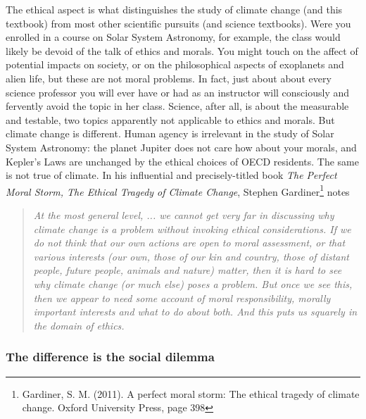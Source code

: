 The ethical aspect is what distinguishes the study of climate change (and this textbook) from most other scientific pursuits (and science textbooks). Were you enrolled in a course on Solar System Astronomy, for example, the class would likely be devoid of the talk of ethics and morals. You might touch on the affect of potential impacts on society, or on the philosophical aspects of exoplanets and alien life, but these are not moral problems. In fact, just about about every science professor you will ever have or had as an instructor will consciously and fervently avoid the topic in her class. Science, after all, is about the measurable and testable, two topics apparently not applicable to ethics and morals. But climate change is different. Human agency is irrelevant in the study of Solar System Astronomy: the planet Jupiter does not care how about your morals, and Kepler's Laws are unchanged by the ethical choices of OECD residents. The same is not true of climate. In his influential and precisely-titled book \textit{The Perfect Moral Storm, The Ethical Tragedy of Climate Change}, Stephen Gardiner\footnote{Gardiner, S. M. (2011). A perfect moral storm: The ethical tragedy of climate change. Oxford University Press, page 398} notes

\begin{quotation}\noindent\textit{At the most general level, ... we cannot get very far in discussing why climate change is a problem without invoking ethical considerations. If we do not think that our own actions are open to moral assessment, or that various interests (our own, those of our kin and country, those of distant people, future people, animals and nature) matter, then it is hard to see why climate change (or much else) poses a problem. But once we see this, then we appear to need some account of moral responsibility, morally important interests and what to do about both. And this puts us squarely in the domain of ethics.}
\end{quotation}
 
\subsubsection{The difference is the social dilemma}\label{Prisoners_D}
